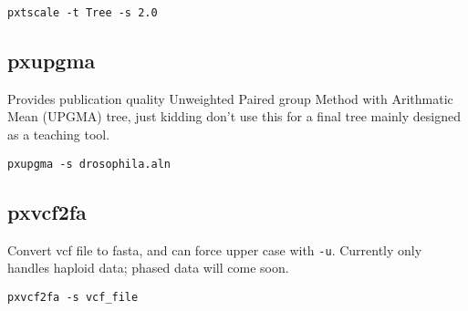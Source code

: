 \documentclass[12pt,letterpaper]{memoir}
\begin{document}
\begin{flushleft}
\begin{verbatim}
pxtscale -t Tree -s 2.0
\end{verbatim}
\end{flushleft}

\subsection{pxupgma}

Provides publication quality Unweighted Paired group Method with Arithmatic Mean (UPGMA) tree, just kidding don't use this for a final tree mainly designed as a teaching tool.

\begin{flushleft}
\begin{verbatim}
pxupgma -s drosophila.aln
\end{verbatim}
\end{flushleft}

\subsection{pxvcf2fa}
Convert vcf file to fasta, and can force upper case with \texttt{-u}.
Currently only handles haploid data; phased data will come soon.

\begin{flushleft}
\begin{verbatim}
pxvcf2fa -s vcf_file
\end{verbatim}
\end{flushleft}
\end{document}
